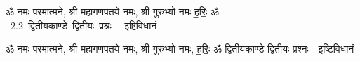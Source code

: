 \documentclass[17pt]{extarticle}
\begin{document}
\begin{titlepage}
    \begin{center}
 
\begin{sanskrit}
    { \Large
    ॐ नमः परमात्मने, श्री महागणपतये नमः, श्री गुरुभ्यो नमः
ह॒रिः॒ ॐ 
    }
    \\
    \vspace{2.5cm}
    \mbox{ \Huge
    2.2     द्वितीयकाण्डे द्वितीयः प्रश्नः - इष्टिविधानं   }
\end{sanskrit}
\end{center}

\end{titlepage}
\tableofcontents

ॐ नमः परमात्मने, श्री महागणपतये नमः, 
श्री गुरुभ्यो नमः, ह॒रिः॒ ॐ      द्वितीयकाण्डे द्वितीयः प्रश्नः - इष्टिविधानं \newline

\end{document}
